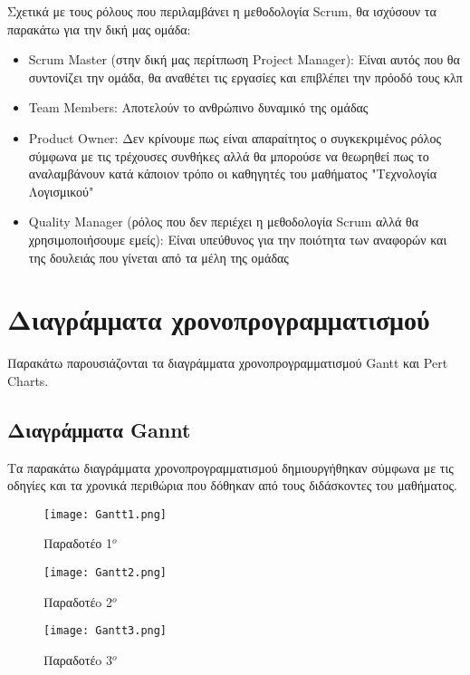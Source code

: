 \documentclass{article}
\begin{document}
Σχετικά με τους ρόλους που περιλαμβάνει η μεθοδολογία Scrum, θα ισχύσουν τα παρακάτω για την δική μας ομάδα:

\begin{itemize}
  \item Scrum Master (στην δική μας περίτπωση Project Manager): Είναι αυτός που θα συντονίζει την ομάδα, θα αναθέτει τις εργασίες και επιβλέπει την πρόοδό τους κλπ
  \item Team Members: Αποτελούν το ανθρώπινο δυναμικό της ομάδας
  \item Product Owner: Δεν κρίνουμε πως είναι απαραίτητος ο συγκεκριμένος ρόλος σύμφωνα με τις τρέχουσες συνθήκες αλλά θα μπορούσε να θεωρηθεί πως το αναλαμβάνουν κατά κάποιον τρόπο οι καθηγητές του μαθήματος "Τεχνολογία Λογισμικού"
  \item Quality Manager (ρόλος που δεν περιέχει η μεθοδολογία Scrum αλλά θα χρησιμοποιήσουμε εμείς): Είναι υπεύθυνος για την ποιότητα των αναφορών και της δουλειάς που γίνεται από τα μέλη της ομάδας
\end{itemize}

\section{Διαγράμματα χρονοπρογραμματισμού}

Παρακάτω παρουσιάζονται τα διαγράμματα χρονοπρογραμματισμού Gantt και Pert Charts.

\subsection{Διαγράμματα Gannt}

Τα παρακάτω διαγράμματα χρονοπρογραμματισμού δημιουργήθηκαν σύμφωνα με τις οδηγίες και τα χρονικά περιθώρια που δόθηκαν από τους διδάσκοντες του μαθήματος.

\vspace{0.3cm}

\begin{figure}[!htb]
\centering
\texttt{[image: Gantt1.png]}
\caption{\label{fig:Gantt1} Παραδοτέο 1$^o$}
\end{figure}

\newpage
 
\begin{figure}[!htb]
\centering
\texttt{[image: Gantt2.png]}
\caption{\label{fig:Gantt2} Παραδοτέo 2$^o$}
\end{figure}

\begin{figure}[!htb]
\centering
\texttt{[image: Gantt3.png]}
\caption{\label{fig:Gannt3} Παραδοτέo 3$^o$}
\end{figure}
\end{document}
